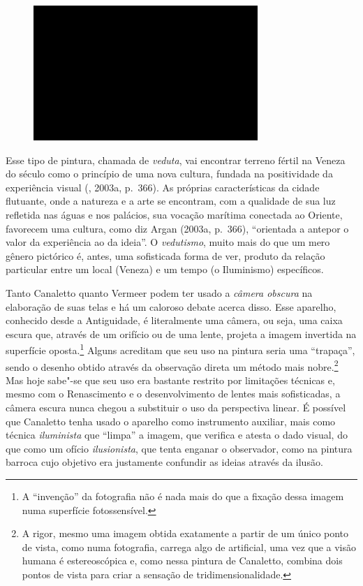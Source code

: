 \begin{figure}[!ht]

\centering
 \includegraphics[width=85mm]{./imgs/im1.jpg}
\caption{\tiny{}}

\end{figure}

Esse tipo de pintura, chamada de \emph{veduta}, vai encontrar terreno
fértil na Veneza do século  como o princípio de uma nova cultura,
fundada na positividade da experiência visual (, 2003a, p.~366). As
próprias características da cidade flutuante, onde a natureza e a arte
se encontram, com a qualidade de sua luz refletida nas águas e nos
palácios, sua vocação marítima conectada ao Oriente, favorecem uma
cultura, como diz Argan (2003a, p.~366), ``orientada a antepor o valor
da experiência ao da ideia''. O \emph{vedutismo}, muito mais do que um
mero gênero pictórico é, antes, uma sofisticada forma de ver, produto da
relação particular entre um local (Veneza) e um tempo (o Iluminismo)
específicos.

Tanto Canaletto quanto Vermeer podem ter usado a \emph{câmera obscura}
na elaboração de suas telas e há um caloroso debate acerca disso. Esse
aparelho, conhecido desde a Antiguidade, é literalmente uma câmera, ou
seja, uma caixa escura que, através de um orifício ou de uma lente,
projeta a imagem invertida na superfície oposta.\footnote{A ``invenção''
  da fotografia não é nada mais do que a fixação dessa imagem numa
  superfície fotossensível.} Alguns acreditam que seu uso na pintura
seria uma ``trapaça'', sendo o desenho obtido através da observação
direta um método mais nobre.\footnote{A rigor, mesmo uma imagem obtida
  exatamente a partir de um único ponto de vista, como numa fotografia,
  carrega algo de artificial, uma vez que a visão humana é
  estereoscópica e, como nessa pintura de Canaletto, combina dois pontos
  de vista para criar a sensação de tridimensionalidade.} Mas hoje
sabe"-se que seu uso era bastante restrito por limitações técnicas e,
mesmo com o Renascimento e o desenvolvimento de lentes mais
sofisticadas, a câmera escura nunca chegou a substituir o uso da \label{canaletto}
perspectiva linear. É possível que Canaletto tenha usado o aparelho como
instrumento auxiliar, mais como técnica \emph{iluminista} que ``limpa''
a imagem, que verifica e atesta o dado visual, do que como um ofício
\emph{ilusionista}, que tenta enganar o observador, como na pintura
barroca cujo objetivo era justamente confundir as ideias através da
ilusão.

